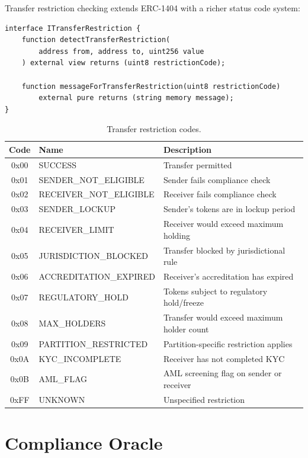 \documentclass[11pt,a4paper]{article}
\begin{document}
Transfer restriction checking extends ERC-1404 with a richer status code system:

\begin{lstlisting}[language=Solidity,caption={Transfer restriction interface.}]
interface ITransferRestriction {
    function detectTransferRestriction(
        address from, address to, uint256 value
    ) external view returns (uint8 restrictionCode);

    function messageForTransferRestriction(uint8 restrictionCode)
        external pure returns (string memory message);
}
\end{lstlisting}

\begin{table}[H]
\centering
\caption{Transfer restriction codes.}
\label{tab:restriction-codes}
\begin{tabular}{clp{6cm}}
\toprule
\textbf{Code} & \textbf{Name} & \textbf{Description} \\
\midrule
0x00 & SUCCESS & Transfer permitted \\
0x01 & SENDER\_NOT\_ELIGIBLE & Sender fails compliance check \\
0x02 & RECEIVER\_NOT\_ELIGIBLE & Receiver fails compliance check \\
0x03 & SENDER\_LOCKUP & Sender's tokens are in lockup period \\
0x04 & RECEIVER\_LIMIT & Receiver would exceed maximum holding \\
0x05 & JURISDICTION\_BLOCKED & Transfer blocked by jurisdictional rule \\
0x06 & ACCREDITATION\_EXPIRED & Receiver's accreditation has expired \\
0x07 & REGULATORY\_HOLD & Tokens subject to regulatory hold/freeze \\
0x08 & MAX\_HOLDERS & Transfer would exceed maximum holder count \\
0x09 & PARTITION\_RESTRICTED & Partition-specific restriction applies \\
0x0A & KYC\_INCOMPLETE & Receiver has not completed KYC \\
0x0B & AML\_FLAG & AML screening flag on sender or receiver \\
0xFF & UNKNOWN & Unspecified restriction \\
\bottomrule
\end{tabular}
\end{table}

\section{Compliance Oracle}\label{sec:compliance}
\end{document}

